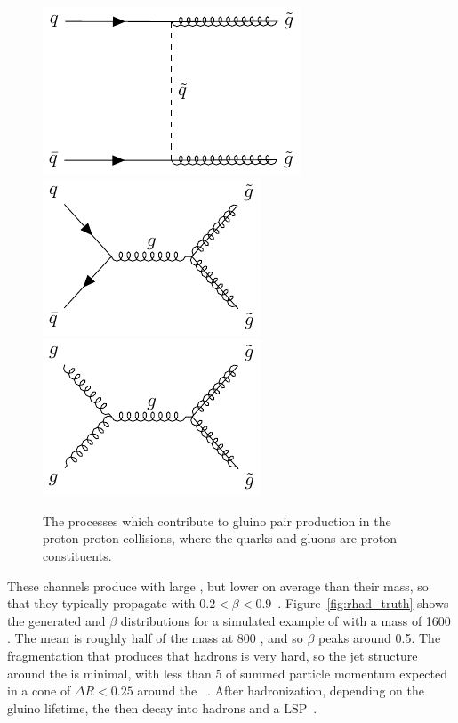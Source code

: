 \begin{figure}
\centering
\includegraphics[width=\halffig]{figures/qq_t_gluinos.pdf}
\includegraphics[width=\halffig]{figures/qq_s_gluinos.pdf}\\
\includegraphics[width=\halffig]{figures/gg_gluinos.pdf}
\caption{The processes which contribute to gluino pair production in the proton proton collisions, where the quarks and gluons are proton constituents.}
\label{fig:gluino_pair}
\end{figure}

These channels produce \rhadrons with large \pt, but lower on average than their mass, so that they typically propagate with $0.2 < \beta < 0.9$~\cite{rhad_atlas}.
Figure~\ref{fig:rhad_truth} shows the generated \pt and $\beta$ distributions for a simulated example of \rhadrons with a mass of 1600 \GeV.
The mean \pt is roughly half of the mass at 800 \GeV, and so $\beta$ peaks around 0.5.
The fragmentation that produces that hadrons is very hard, so the jet structure around the \rhadron is minimal, with less than 5 \GeV of summed particle momentum expected in a cone of $\Delta R < 0.25$ around the \rhadron~\cite{rhad_atlas}.
After hadronization, depending on the gluino lifetime, the \rhadrons then decay into hadrons and a \ac{LSP}~\cite{rhadron}.

